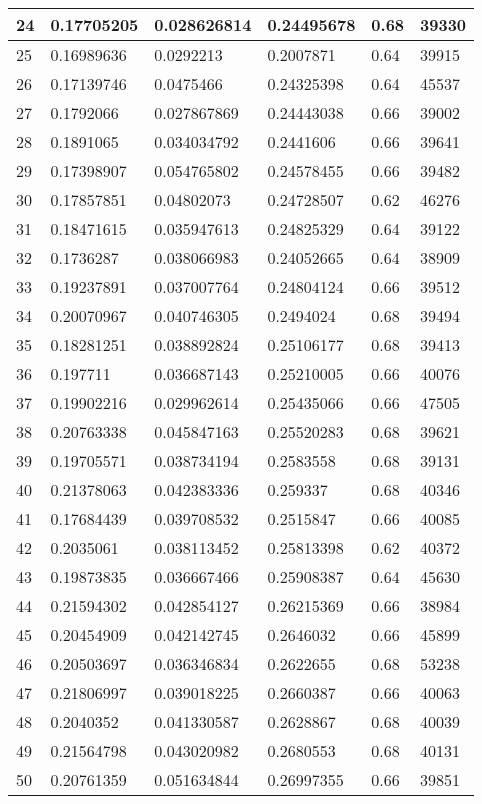 \begin{longtable}{|l|l|l|l|l|l|}
24 & 0.17705205 & 0.028626814 & 0.24495678 & 0.68 & 39330 \\ \hline 
25 & 0.16989636 & 0.0292213 & 0.2007871 & 0.64 & 39915 \\ \hline 
26 & 0.17139746 & 0.0475466 & 0.24325398 & 0.64 & 45537 \\ \hline 
27 & 0.1792066 & 0.027867869 & 0.24443038 & 0.66 & 39002 \\ \hline 
28 & 0.1891065 & 0.034034792 & 0.2441606 & 0.66 & 39641 \\ \hline 
29 & 0.17398907 & 0.054765802 & 0.24578455 & 0.66 & 39482 \\ \hline 
30 & 0.17857851 & 0.04802073 & 0.24728507 & 0.62 & 46276 \\ \hline 
31 & 0.18471615 & 0.035947613 & 0.24825329 & 0.64 & 39122 \\ \hline 
32 & 0.1736287 & 0.038066983 & 0.24052665 & 0.64 & 38909 \\ \hline 
33 & 0.19237891 & 0.037007764 & 0.24804124 & 0.66 & 39512 \\ \hline 
34 & 0.20070967 & 0.040746305 & 0.2494024 & 0.68 & 39494 \\ \hline 
35 & 0.18281251 & 0.038892824 & 0.25106177 & 0.68 & 39413 \\ \hline 
36 & 0.197711 & 0.036687143 & 0.25210005 & 0.66 & 40076 \\ \hline 
37 & 0.19902216 & 0.029962614 & 0.25435066 & 0.66 & 47505 \\ \hline 
38 & 0.20763338 & 0.045847163 & 0.25520283 & 0.68 & 39621 \\ \hline 
39 & 0.19705571 & 0.038734194 & 0.2583558 & 0.68 & 39131 \\ \hline 
40 & 0.21378063 & 0.042383336 & 0.259337 & 0.68 & 40346 \\ \hline 
41 & 0.17684439 & 0.039708532 & 0.2515847 & 0.66 & 40085 \\ \hline 
42 & 0.2035061 & 0.038113452 & 0.25813398 & 0.62 & 40372 \\ \hline 
43 & 0.19873835 & 0.036667466 & 0.25908387 & 0.64 & 45630 \\ \hline 
44 & 0.21594302 & 0.042854127 & 0.26215369 & 0.66 & 38984 \\ \hline 
45 & 0.20454909 & 0.042142745 & 0.2646032 & 0.66 & 45899 \\ \hline 
46 & 0.20503697 & 0.036346834 & 0.2622655 & 0.68 & 53238 \\ \hline 
47 & 0.21806997 & 0.039018225 & 0.2660387 & 0.66 & 40063 \\ \hline 
48 & 0.2040352 & 0.041330587 & 0.2628867 & 0.68 & 40039 \\ \hline 
49 & 0.21564798 & 0.043020982 & 0.2680553 & 0.68 & 40131 \\ \hline 
50 & 0.20761359 & 0.051634844 & 0.26997355 & 0.66 & 39851 \\ \hline 
\end{longtable}
